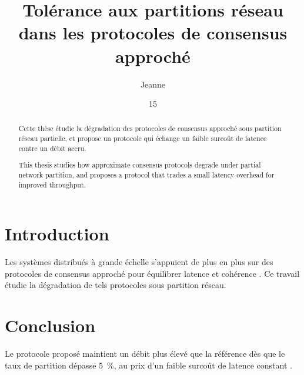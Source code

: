 \documentclass{yathesis}
\author[]{Jeanne}{Dupont}
\title[]{Tol\'erance aux partitions r\'eseau dans les protocoles de consensus approch\'e}
\date{15}{9}{2026}
\institute[]{Universit\'e de Sciences et Techniques}
\begin{document}
\maketitle

\makekeywords

\begin{abstract}
Cette th\`ese \'etudie la d\'egradation des protocoles de consensus
approch\'e sous partition r\'eseau partielle, et propose un protocole
qui \'echange un faible surco\^ut de latence contre un d\'ebit accru.
\end{abstract}
\begin{abstract}
This thesis studies how approximate consensus protocols degrade under
partial network partition, and proposes a protocol that trades a small
latency overhead for improved throughput.
\end{abstract}
\makeabstract

\tableofcontents[depth=chapter,name=Sommaire]
\listoftables
\listoffigures

\mainmatter

\chapter*{Introduction}

Les syst\`emes distribu\'es \`a grande \'echelle s'appuient de plus en
plus sur des protocoles de consensus approch\'e pour \'equilibrer
latence et coh\'erence \citep{lamport1998part}. Ce travail \'etudie la
d\'egradation de tels protocoles sous partition r\'eseau.




\chapter*{Conclusion}

Le protocole propos\'e maintient un d\'ebit plus \'elev\'e que la
r\'ef\'erence d\`es que le taux de partition d\'epasse 5~\%, au prix
d'un faible surco\^ut de latence constant \citep{ongaro2014search}.



\end{document}
